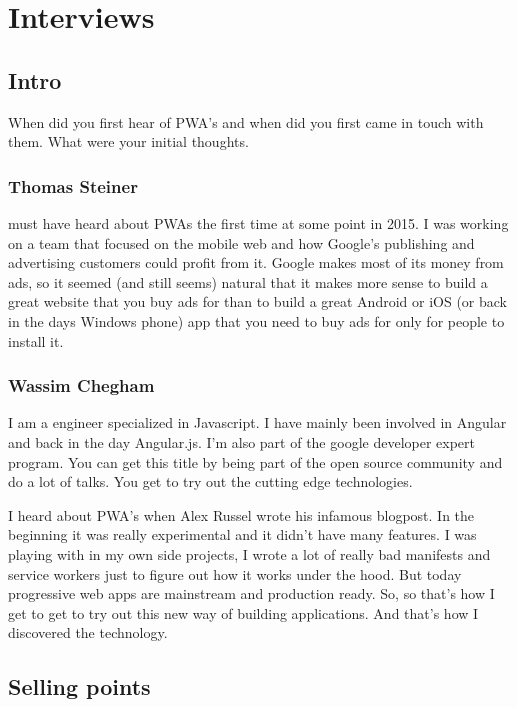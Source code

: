 \chapter{Interviews}
\label{ch:Interview}



	\section{Intro}
	
		When did you first hear of PWA's and when did you first came in touch with them. What were your initial thoughts. 
	
		\subsection{Thomas Steiner}
		
			 must have heard about PWAs the first time at some point in 2015. I was working on a team that focused on the mobile web and how Google’s publishing and advertising customers could profit from it. Google makes most of its money from ads, so it seemed (and still seems) natural that it makes more sense to build a great website that you buy ads for than to build a great Android or iOS (or back in the days Windows phone) app that you need to buy ads for only for people to install it.
		
		\subsection{Wassim Chegham}
		
			I am a engineer specialized in Javascript. I have mainly been involved in Angular and back in the day Angular.js. I'm also part of the google developer expert program. You can get this title by being part of the open source community and do a lot of talks. You get to try out the cutting edge technologies. 
		
			I heard about PWA's when Alex Russel wrote his infamous blogpost. In the beginning it was really experimental and it didn't have many features. I was playing with in my own side projects, I wrote a lot of really bad manifests and service workers just to figure out how it works under the hood. But today progressive web apps are mainstream and production ready.  So, so that's how I get to get to try out this new way of building applications. And that's how I discovered the technology.
		
	
	\section{Selling points}
	
